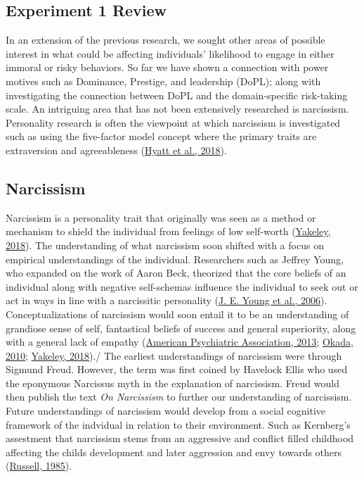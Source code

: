 \documentclass[
  donotrepeattitle,doc, 12pt, a4paper,floatsintext]{apa7}
\begin{document}
\hypertarget{experiment-1-review}{%
\subsection{Experiment 1 Review}\label{experiment-1-review}}

In an extension of the previous research, we sought other areas of possible interest in what could be affecting individuals' likelihood to engage in either immoral or risky behaviors. So far we have shown a connection with power motives such as Dominance, Prestige, and leadership (DoPL); along with investigating the connection between DoPL and the domain-specific risk-taking scale. An intriguing area that has not been extensively researched is narcissism. Personality research is often the viewpoint at which narcissism is investigated such as using the five-factor model concept where the primary traits are extraversion and agreeableness (\protect\hyperlink{ref-hyatt2018}{Hyatt et al., 2018}).

\hypertarget{narcissism}{%
\subsection{Narcissism}\label{narcissism}}

Narcissism is a personality trait that originally was seen as a method or mechanism to shield the individual from feelings of low self-worth (\protect\hyperlink{ref-yakeley2018}{Yakeley, 2018}). The understanding of what narcissism soon shifted with a focus on empirical understandings of the individual. Researchers such as Jeffrey Young, who expanded on the work of Aaron Beck, theorized that the core beliefs of an individual along with negative self-schemas influence the individual to seek out or act in ways in line with a narcissitic personality (\protect\hyperlink{ref-young2006}{J. E. Young et al., 2006}). Conceptualizations of narcissism would soon entail it to be an understanding of grandiose sense of self, fantastical beliefs of success and general superiority, along with a general lack of empathy (\protect\hyperlink{ref-americanpsychiatricassociation2013}{American Psychiatric Association, 2013}; \protect\hyperlink{ref-okada2010}{Okada, 2010}; \protect\hyperlink{ref-yakeley2018}{Yakeley, 2018})./
The earliest understandings of narcissism were through Sigmund Freud. However, the term was first coined by Havelock Ellis who used the eponymous Narcissus myth in the explanation of narcissism. Freud would then publish the text \emph{On Narcissism} to further our understanding of narcissism. Future understandings of narcissism would develop from a social cognitive framework of the indvidual in relation to their environment. Such as Kernberg's assestment that narcissism stems from an aggressive and conflict filled childhood affecting the childs development and later aggression and envy towards others (\protect\hyperlink{ref-russell1985a}{Russell, 1985}).
\end{document}
